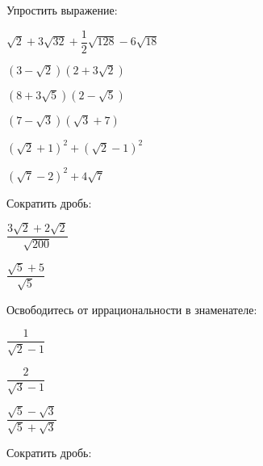 \begin{enumcols}[label=\textbf{\arabic*.}]
	\item Упростить выражение:
	\begin{enumcols}[itemcolumns=2]
		\item \( \sqrt{2}+3\sqrt{32}+\dfrac{1}{2}\sqrt{128}-6\sqrt{18} \)
		\item \( (3-\sqrt{2})(2+3\sqrt{2}) \)
		\item \( (8+3\sqrt{5})(2-\sqrt{5}) \)
		\item \( (7-\sqrt{3})(\sqrt{3}+7) \)
		\item \( (\sqrt{2}+1)^2+(\sqrt{2}-1)^2 \)
		\item \( (\sqrt{7}-2)^2+4\sqrt{7} \)
	\end{enumcols}
	\item Сократить дробь:
	\begin{enumcols}[itemcolumns=2]
		\item \( \dfrac{3\sqrt{2}+2\sqrt{2}}{\sqrt{200}} \)
		\item \( \dfrac{\sqrt{5}+5}{\sqrt{5}} \)
	\end{enumcols}
	\item Освободитесь от иррациональности в знаменателе:
	\begin{enumcols}[itemcolumns=3]
		\item \( \dfrac{1}{\sqrt{2}-1} \)
		\item \( \dfrac{2}{\sqrt{3}-1} \)
		\item \( \dfrac{\sqrt{5}-\sqrt{3}}{\sqrt{5}+\sqrt{3}} \)
	\end{enumcols}
	\item Сократить дробь:
	\begin{enumcols}[itemcolumns=4]
		\item {}
		\item {}
		\item {}
		\item {}
		\item {}
		\item {}
		\item {}
		\item {}
		\item {}
		\item {}
		\item {}
		\item {}
		\item {}

\end{enumcols}
\end{enumcols}
